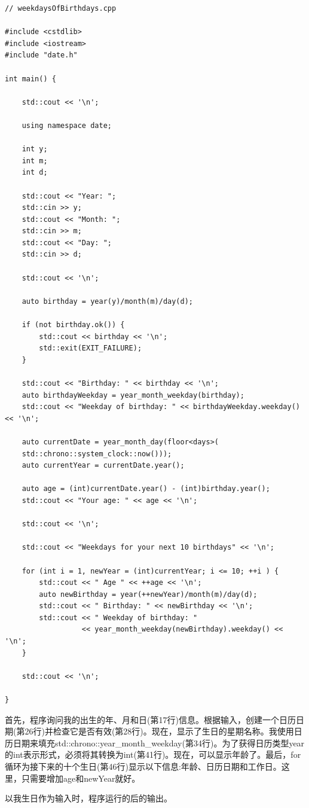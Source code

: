 \begin{lstlisting}[style=styleCXX]
// weekdaysOfBirthdays.cpp

#include <cstdlib>
#include <iostream>
#include "date.h"

int main() {
	
	std::cout << '\n';
	
	using namespace date;
	
	int y;
	int m;
	int d;
	
	std::cout << "Year: ";
	std::cin >> y;
	std::cout << "Month: ";
	std::cin >> m;
	std::cout << "Day: ";
	std::cin >> d;
	
	std::cout << '\n';
	
	auto birthday = year(y)/month(m)/day(d);
	
	if (not birthday.ok()) {
		std::cout << birthday << '\n';
		std::exit(EXIT_FAILURE);
	}
	
	std::cout << "Birthday: " << birthday << '\n';
	auto birthdayWeekday = year_month_weekday(birthday);
	std::cout << "Weekday of birthday: " << birthdayWeekday.weekday() << '\n';
	
	auto currentDate = year_month_day(floor<days>(
	std::chrono::system_clock::now()));
	auto currentYear = currentDate.year();
	
	auto age = (int)currentDate.year() - (int)birthday.year();
	std::cout << "Your age: " << age << '\n';
	
	std::cout << '\n';
	
	std::cout << "Weekdays for your next 10 birthdays" << '\n';
	
	for (int i = 1, newYear = (int)currentYear; i <= 10; ++i ) {
		std::cout << " Age " << ++age << '\n';
		auto newBirthday = year(++newYear)/month(m)/day(d);
		std::cout << " Birthday: " << newBirthday << '\n';
		std::cout << " Weekday of birthday: "
				  << year_month_weekday(newBirthday).weekday() << '\n';
	}
	
	std::cout << '\n';
	
}
\end{lstlisting}

首先，程序询问我的出生的年、月和日(第17行)信息。根据输入，创建一个日历日期(第26行)并检查它是否有效(第28行)。现在，显示了生日的星期名称。我使用日历日期来填充std::chrono::year\_month\_weekday(第34行)。为了获得日历类型year的int表示形式，必须将其转换为int(第41行)。现在，可以显示年龄了。最后，for循环为接下来的十个生日(第46行)显示以下信息:年龄、日历日期和工作日。这里，只需要增加age和newYear就好。

以我生日作为输入时，程序运行的后的输出。

